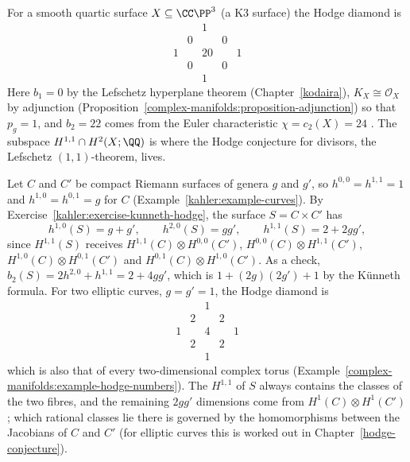 \begin{example}\label{kahler:example-quartic}
For a smooth quartic surface $X \subseteq \CC\PP^3$ (a K3 surface) the Hodge diamond is
\[
\begin{array}{ccccc}
 & & 1 & & \\
 & 0 & & 0 & \\
1 & & 20 & & 1 \\
 & 0 & & 0 & \\
 & & 1 & &
\end{array}
\]
Here $b_1 = 0$ by the Lefschetz hyperplane theorem (Chapter~\ref{kodaira}), $K_X \cong \mathcal{O}_X$ by adjunction
(Proposition~\ref{complex-manifolds:proposition-adjunction}) so that $p_g = 1$, and $b_2 = 22$ comes from the Euler characteristic
$\chi = c_2(X) = 24$ \cite[Chapter VIII]{bhpv}. The subspace $H^{1,1} \cap H^2(X; \QQ)$ is where the Hodge conjecture for
divisors, the Lefschetz $(1,1)$-theorem, lives.
\end{example}

\begin{example}\label{kahler:example-product-curves}
Let $C$ and $C'$ be compact Riemann surfaces of genera $g$ and $g'$, so $h^{0,0} = h^{1,1} = 1$ and $h^{1,0} = h^{0,1} = g$ for $C$ (Example~\ref{kahler:example-curves}). By
Exercise~\ref{kahler:exercise-kunneth-hodge}, the surface $S = C \times C'$ has
\[
h^{1,0}(S) = g + g', \qquad h^{2,0}(S) = gg', \qquad h^{1,1}(S) = 2 + 2gg',
\]
since $H^{1,1}(S)$ receives $H^{1,1}(C) \otimes H^{0,0}(C')$, $H^{0,0}(C) \otimes H^{1,1}(C')$, $H^{1,0}(C) \otimes H^{0,1}(C')$ and $H^{0,1}(C) \otimes H^{1,0}(C')$. As a check, $b_2(S) = 2h^{2,0} + h^{1,1} = 2 + 4gg'$, which is
$1 + (2g)(2g') + 1$ by the K\"unneth formula. For two elliptic curves, $g = g' = 1$, the Hodge diamond is
\[
\begin{array}{ccccc}
 & & 1 & & \\
 & 2 & & 2 & \\
1 & & 4 & & 1 \\
 & 2 & & 2 & \\
 & & 1 & &
\end{array}
\]
which is also that of every two-dimensional complex torus (Example~\ref{complex-manifolds:example-hodge-numbers}). The $H^{1,1}$ of $S$ always contains the classes of the two fibres, and the remaining $2gg'$
dimensions come from $H^1(C) \otimes H^1(C')$; which rational classes lie there is governed by the homomorphisms between the Jacobians of $C$ and $C'$ (for elliptic curves this is worked out in
Chapter~\ref{hodge-conjecture}).
\end{example}

